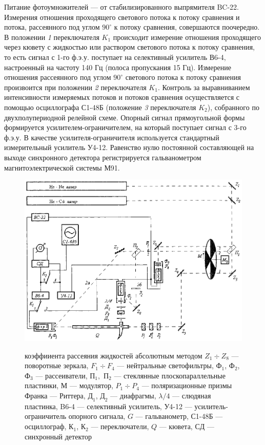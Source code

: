 Питание фотоумножителей --- от стабилизированного выпрямителя
BC-22. Измерения отношения проходящего светового потока к потоку
сравнения и потока, рассеянного под углом $90^{\circ}$ к потоку
сравнения, совершаются поочередно. В положении {\it 1}
переключателя $K_1$ происходит измерение отношения проходящего
через кювету с жидкостью или раствором светового потока к потоку
сравнения, то есть сигнал с 1-го ф.э.у. поступает на селективный
усилитель В6-4, настроенный на частоту 140 Гц (полоса пропускания
15 Гц). Измерение отношения рассеянного под углом $90^{\circ}$
светового потока к потоку сравнения произвоится при положении
{\it 2} переключателя $K_1$. Контроль за выравниванием
интенсивности измеряемых потоков и потоков сравнения
осуществляется с помощью осциллографа С1-48Б (положение {\it 3}
переключателя $K_2$), собранного по двухполупериодной  релейной
схеме. Опорный сигнал прямоугольной формы формируется
усилителем-ограничителем, на который поступает сигнал с 3-го
ф.э.у. В качестве усилителя-ограничителя используется стандартный
измерительный усилитель У4-12. Равенство нулю постоянной
составляющей на выходе синхронного детектора регистрируется
гальванометром магнитоэлектрической системы М91.

\begin{center}
\begin{figure}[t]
\centerline{\hbox{\includegraphics[scale=0.8]{Ris/ris_eps/ris5_3d.eps}}}

{\ris 
коэффииента
рассеяния жидкостей абсолютным методом 
$Z_1\div Z_8$ ---
поворотные зеркала, $F_1\div F_4$ --- нейтральные светофильтры,
$Ф_1$, $Ф_2$, 
$Ф_3$ --- рассеиватели, $П_1,$ $П_2$ --- стеклянные
плоскопараллельные пластинки,
$М$ --- модулятор, $P_1\div P_4$
--- поляризационные призмы Франка --- Риттера, $Д_1$, $Д_2$ ---
диафрагмы, 
$\lambda/4$ --- слюдяная пластинка, B6-4 ---
селективный усилитель,
У4-12 --- усилитель-ограничитель опорного
сигнала, $G$ --- гальванометр, 
С1-48Б --- осциллограф, $К_1$,
$К_2$ --- переключатели, $Q$ --- кювета, $СД$ --- синхронный
детектор}
\end{figure}
\end{center}


